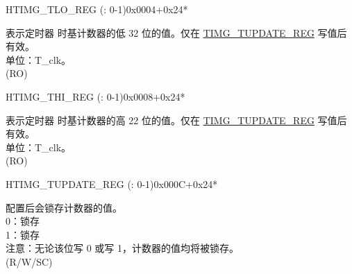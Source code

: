 \begin{register}{H}{TIMG\_TLO\_REG (: 0-1)}{0x0004+0x24*}\label{regdesc:TIMGTXLOREG}
%
\regnewline%
\begin{regdesc}\begin{reglist}
\label{fielddesc:TIMGTXLO}\item [TIMG\_T\regindex{x}\_LO] 表示定时器  时基计数器的低 32 位的值。仅在 \hyperref[regdesc:TIMGTXUPDATEREG]{TIMG\_TUPDATE\_REG} 写值后有效。 \\
单位：T\_clk。 \\ (RO)
\end{reglist}\end{regdesc}
\end{register}


\begin{register}{H}{TIMG\_THI\_REG (: 0-1)}{0x0008+0x24*}\label{regdesc:TIMGTXHIREG}
%
%
\regnewline%
\begin{regdesc}\begin{reglist}
\label{fielddesc:TIMGTXHI}\item [TIMG\_T\regindex{x}\_HI] 表示定时器  时基计数器的高 22 位的值。仅在 \hyperref[regdesc:TIMGTXUPDATEREG]{TIMG\_TUPDATE\_REG} 写值后有效。 \\
单位：T\_clk。 \\ (RO)
\end{reglist}\end{regdesc}
\end{register}


\begin{register}{H}{TIMG\_TUPDATE\_REG (: 0-1)}{0x000C+0x24*}\label{regdesc:TIMGTXUPDATEREG}
%
%
\regnewline%
\begin{regdesc}\begin{reglist}
\label{fielddesc:TIMGTXUPDATE}\item [TIMG\_T\regindex{x}\_UPDATE] 配置后会锁存计数器的值。 \\
0：锁存 \\
1：锁存 \\
注意：无论该位写 0 或写 1，计数器的值均将被锁存。\\ (R/W/SC)
\end{reglist}\end{regdesc}
\end{register}


